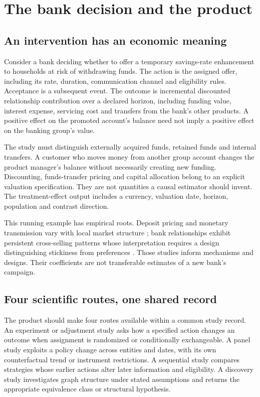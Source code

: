 \chapter{The bank decision and the product}\label{ch:product}
\section{An intervention has an economic meaning}
Consider a bank deciding whether to offer a temporary savings-rate enhancement
to households at risk of withdrawing funds. The action is the assigned offer,
including its rate, duration, communication channel and eligibility rules.
Acceptance is a subsequent event. The outcome is incremental discounted
relationship contribution over a declared horizon, including funding value,
interest expense, servicing cost and transfers from the bank's other products.
A positive effect on the promoted account's balance need not imply a positive
effect on the banking group's value.

The study must distinguish externally acquired funds, retained funds and
internal transfers. A customer who moves money from another group account
changes the product manager's balance without necessarily creating new funding.
Discounting, funds-transfer pricing and capital allocation belong to an explicit
valuation specification. They are not quantities a causal estimator should
invent. The treatment-effect output includes a currency, valuation
date, horizon, population and contrast direction.

This running example has empirical roots. Deposit pricing and monetary
transmission vary with local market structure \citep{drechsler2017};
bank relationships exhibit persistent cross-selling patterns whose
interpretation requires a design distinguishing stickiness from preferences
\citep{basten2026}. Those studies inform mechanisms and designs. Their
coefficients are not transferable estimates of a new bank's campaign.

\section{Four scientific routes, one shared record}
The product should make four routes available within a common study record.
An experiment or adjustment study asks how a specified action changes an
outcome when assignment is randomized or conditionally exchangeable.
A panel study exploits a policy change across entities and dates, with its
own counterfactual trend or instrument restrictions.
A sequential study compares strategies whose earlier actions alter
later information and eligibility.
A discovery study investigates graph structure under stated assumptions and
returns the appropriate equivalence class or structural hypothesis.

